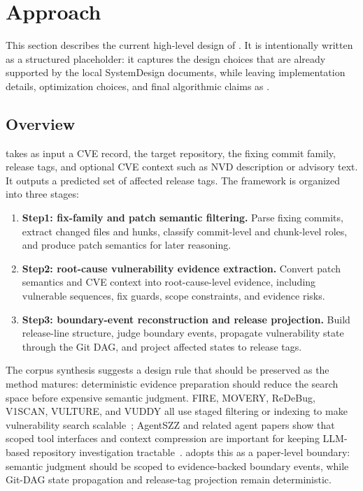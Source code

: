 \section{\toolname Approach}
\label{sec:approach}

This section describes the current high-level design of \toolname. It is intentionally written as a structured placeholder: it captures the design choices that are already supported by the local SystemDesign documents, while leaving implementation details, optimization choices, and final algorithmic claims as .

\subsection{Overview}
\toolname takes as input a CVE record, the target repository, the fixing commit family, release tags, and optional CVE context such as NVD description or advisory text. It outputs a predicted set of affected release tags. The framework is organized into three stages:
\begin{enumerate}[leftmargin=*]
  \item \textbf{Step1: fix-family and patch semantic filtering.} Parse fixing commits, extract changed files and hunks, classify commit-level and chunk-level roles, and produce patch semantics for later reasoning.
  \item \textbf{Step2: root-cause vulnerability evidence extraction.} Convert patch semantics and CVE context into root-cause-level evidence, including vulnerable sequences, fix guards, scope constraints, and evidence risks.
  \item \textbf{Step3: boundary-event reconstruction and release projection.} Build release-line structure, judge boundary events, propagate vulnerability state through the Git DAG, and project affected states to release tags.
\end{enumerate}

The corpus synthesis suggests a design rule that should be preserved as the method matures: deterministic evidence preparation should reduce the search space before expensive semantic judgment. FIRE, MOVERY, ReDeBug, V1SCAN, VULTURE, and VUDDY all use staged filtering or indexing to make vulnerability search scalable~\cite{fire2024,movery2022,redebug2012,v1scan2023,vulture2025,vuddy2017}; AgentSZZ and related agent papers show that scoped tool interfaces and context compression are important for keeping LLM-based repository investigation tractable~\cite{agentszz2026,howwhyagents2026}. \toolname adopts this as a paper-level boundary: semantic judgment should be scoped to evidence-backed boundary events, while Git-DAG state propagation and release-tag projection remain deterministic.


